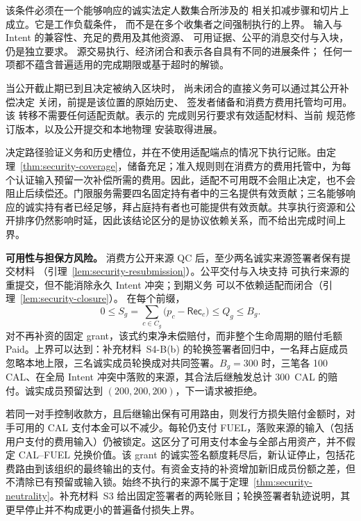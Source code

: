 该条件必须在一个能够响应的诚实法定人数集合所涉及的
相关扣减步骤和切片上成立。它是工作负载条件，
而不是在多个收集者之间强制执行的上界。
输入与 Intent 的兼容性、充足的费用及其他资源、
可用证据、公平的消息交付与入块，仍是独立要求。
源交易执行、经济闭合和表示各自具有不同的进展条件；
任何一项都不蕴含普遍适用的完成期限或基于超时的解锁。

\begin{lemma}[经济闭合不等待适配]
\label{lem:security-closure}
当公开截止期已到且决定被纳入区块时，
尚未闭合的直接义务可以通过其公开补偿决定
关闭，前提是该位置的原始历史、
签发者储备和消费方费用托管均可用。该
转移不需要任何适配贡献。表示的
完成则另行要求有效适配材料、当前
规范修订版本，以及公开提交和本地物理
安装取得进展。
\end{lemma}
\begin{IEEEproof}
决定路径验证义务和历史槽位，并在不使用适配端点的情况下执行记账。由定理~\ref{thm:security-coverage}，储备充足；准入规则则在消费方的费用托管中，为每个认证输入预留一次补偿所需的费用。因此，适配不可用既不会阻止决定，也不会阻止后续偿还。门限服务需要四名固定持有者中的三名提供有效贡献；三名能够响应的诚实持有者已经足够，拜占庭持有者也可能提供有效贡献。共享执行资源和公开排序仍然影响时延，因此该结论区分的是协议依赖关系，而不给出完成时间上界。
\end{IEEEproof}

\noindent\textbf{可用性与担保方风险。}
消费方公开来源 QC 后，至少两名诚实来源签署者保有提交材料
（引理~\ref{lem:security-resubmission}）。公平交付与入块支持
可执行来源的重提交，但不能消除永久 Intent 冲突；到期义务
可以不依赖适配而闭合（引理~\ref{lem:security-closure}）。
在每个前缀，
\[
  0\le S_g=\sum_{c\in C_g}
       \bigl(p_c-\mathsf{Rec}_c\bigr)\le Q_g\le B_g .
\]
对不再补资的固定 grant，该式约束净未偿赔付，而非整个生命周期的赔付毛额 Paid。上界可以达到：补充材料~S4-B(b) 的轮换签署者回归中，一名拜占庭成员忽略本地上限，三名诚实成员轮换成对共同签署。$B_g=300$ 时，三笔各 100 CAL、在全局 Intent 冲突中落败的来源，其合法后继触发总计 300~CAL 的赔付。诚实成员预留达到 $(200,200,200)$，下一请求被拒绝。

若同一对手控制收款方，且后继输出保有可用路由，则发行方损失赔付金额时，对手可用的 CAL 支付本金可以不减少。每轮仍支付 FUEL，落败来源的输入（包括用户支付的费用输入）仍被锁定。这区分了可用支付本金与全部占用资产，并不假定 CAL--FUEL 兑换价值。该 grant 的诚实签名额度耗尽后，新认证停止，包括花费路由到该组织的最终输出的支付。有资金支持的补资增加新旧成员份额之差，但不清除已有预留或输入锁。始终不执行的来源不属于定理~\ref{thm:security-neutrality}。补充材料~S3 给出固定签署者的两轮账目；轮换签署者轨迹说明，其更早停止并不构成更小的普遍备付损失上界。
